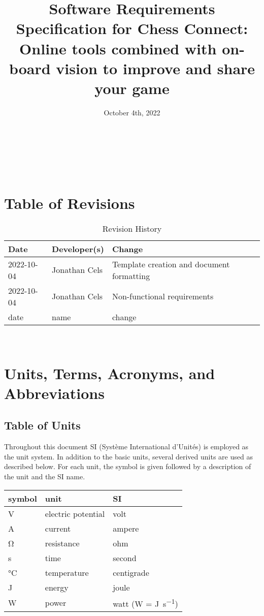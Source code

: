 \documentclass[12pt]{article}
\begin{document}
\title{Software Requirements Specification for Chess Connect: Online tools combined with on-board vision to improve and share your game} 
\author{\authname}
\date{October 4th, 2022}
	
\maketitle

~\newpage

\tableofcontents

~\newpage

\section*{Table of Revisions}
\begin{table}[hp]
\caption{Revision History} \label{TblRevisionHistory}
\begin{tabularx}{\textwidth}{llX}
\toprule
\textbf{Date} & \textbf{Developer(s)} & \textbf{Change}\\
\midrule
2022-10-04 & Jonathan Cels & Template creation and document formatting\\ 
2022-10-04 & Jonathan Cels & Non-functional requirements\\
date & name & change\\
\bottomrule
\end{tabularx}
\end{table}

~\newpage

\section{Units, Terms, Acronyms, and Abbreviations}

\subsection{Table of Units}
Throughout this document SI (Syst\`{e}me International d'Unit\'{e}s) is employed
as the unit system.  In addition to the basic units, several derived units are
used as described below.  For each unit, the symbol is given followed by a
description of the unit and the SI name.

\begin{table}[ht]
  \noindent \begin{tabular}{l l l} 
    \toprule		
    \textbf{symbol} & \textbf{unit} & \textbf{SI}\\
    \midrule 
    \si{\volt} & electric potential & volt\\
    \si{\ampere} & current	& ampere\\
    \si{\ohm} & resistance	& ohm\\
    \si{\second} & time & second\\
    \si{\celsius} & temperature & centigrade\\
    \si{\joule} & energy & joule\\
    \si{\watt} & power & watt (W = \si{\joule\per\second})\\
    \bottomrule
  \end{tabular}
\end{table}
\end{document}
